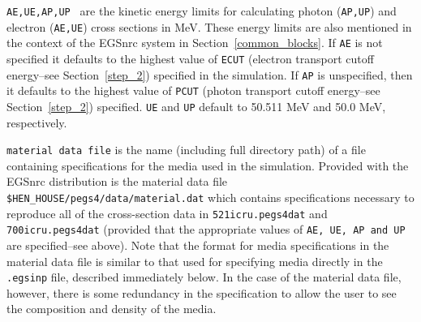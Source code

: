 \documentclass[12pt,twoside]{article}
\begin{document}
\begin{description}
\item {\tt AE,UE,AP,UP } are the kinetic energy limits for calculating photon ({\tt AP,UP}) and electron ({\tt AE,UE}) cross sections in
MeV.  These energy limits are also mentioned in the context of the EGSnrc system in Section~\ref{common_blocks}.
If {\tt AE} is
not specified it defaults to the highest value of {\tt ECUT} (electron transport cutoff energy--see Section~\ref{step_2}) specified
in the simulation.  If
{\tt AP} is unspecified, then it defaults to the highest value of {\tt PCUT} (photon transport cutoff energy--see Section~\ref{step_2})
specified.  {\tt UE} and {\tt UP} default to 50.511 MeV and 50.0 MeV, respectively.

\item {\tt material data file} is the name (including full directory path) of a file containing specifications for the media used
in the simulation.  Provided with the EGSnrc distribution is the material data file {\tt \$HEN\_HOUSE/pegs4/data/material.dat} which
contains specifications necessary to reproduce all of the cross-section data in {\tt 521icru.pegs4dat} and {\tt 700icru.pegs4dat}
(provided that the appropriate values of {\tt AE, UE, AP and UP} are specified--see above).  Note that the format for
media specifications in the material data file is similar to that used for specifying media directly in the
{\tt .egsinp} file, described immediately below.  In the case of the material data file, however, there is some redundancy in the specification to allow the
user to see the composition and density of the media.


\end{description}
\end{document}
